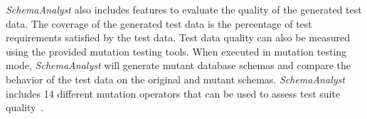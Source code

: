 \textit{SchemaAnalyst} also includes features to evaluate the quality of the generated test data. The
coverage of the generated test data is the percentage of test requirements satisfied by the test data. 
Test data quality can also be measured using the provided mutation testing tools. When executed in
mutation testing mode, \textit{SchemaAnalyst} will generate mutant database schemas and compare the
behavior of the test data on the original and mutant schemas. \textit{SchemaAnalyst} includes 14
different mutation operators that can be used to assess test suite quality~\cite{}.


